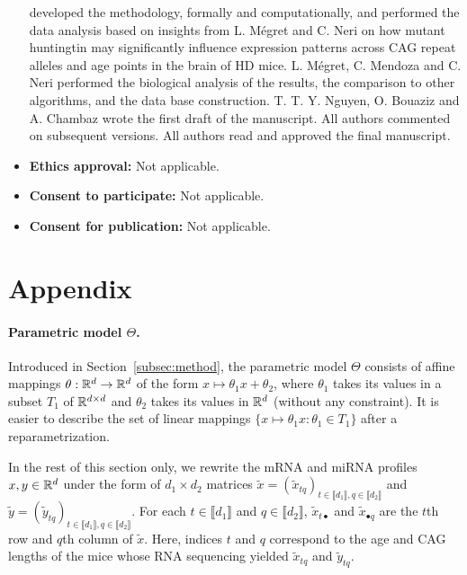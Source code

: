 \begin{itemize}
{    developed the methodology, formally and computationally, and performed the
    data analysis based on insights from L.   Mégret and C. Neri on how mutant
    huntingtin  may significantly  influence  expression  patterns across  CAG
    repeat alleles  and age points  in the brain of  HD mice.  L.   Mégret, C.
    Mendoza and C.  Neri performed the biological analysis of the results, the
    comparison to  other algorithms, and  the data base construction.   T.  T.
    Y.   Nguyen, O.   Bouaziz and  A.  Chambaz  wrote the  first draft  of the
    manuscript.  All  authors commented  on subsequent versions.   All authors
    read and approved the final manuscript.}
\item \textbf{Ethics approval:} Not applicable.
\item \textbf{Consent to participate:} Not applicable.
\item \textbf{Consent for publication:} Not applicable.
\end{itemize}













\section{Appendix}
\label{sec:supp:mat}



\paragraph*{Parametric model $\Theta$.}


Introduced  in  Section~\ref{subsec:method},  the  parametric  model  $\Theta$
consists  of affine  mappings $\theta  : \mathbb{R}^{d}  \to \mathbb{R}^{d}$  of the  form
$x \mapsto \theta_{1} x + \theta_{2}$,  where $\theta_{1}$ takes its values in
a subset  $T_{1}$ of $\mathbb{R}^{d\times d}$  and $\theta_{2}$ takes its  values in
$\mathbb{R}^{d}$ (without  any constraint).   It is  easier to  describe the  set of
linear mappings  $\{x \mapsto \theta_{1} x  : \theta_{1} \in T_{1}\}$  after a
reparametrization.

In the  rest of  this section  only, we  rewrite the  mRNA and  miRNA profiles
$x,y  \in  \mathbb{R}^{d}$   under  the  form  of  $d_{1}   \times  d_{2}$  matrices
$\tilde{x}  =  (\tilde{x}_{tq})_{t  \in   \llbracket  d_{1}\rrbracket,  q  \in
  \llbracket                       d_{2}\rrbracket}$                       and
$\tilde{y}  =  (\tilde{y}_{tq})_{t  \in   \llbracket  d_{1}\rrbracket,  q  \in
  \llbracket d_{2}\rrbracket}$.   For each $t \in  \llbracket d_{1}\rrbracket$
and   $q   \in   \llbracket   d_{2}\rrbracket$,   $\tilde{x}_{t\bullet}$   and
$\tilde{x}_{\bullet q}$  are the  $t$th row and  $q$th column  of $\tilde{x}$.
Here, indices $t$  and $q$ correspond to  the age and CAG lengths  of the mice
whose   RNA   sequencing   yielded  $\tilde{x}_{tq}$   and   $\tilde{y}_{tq}$.


